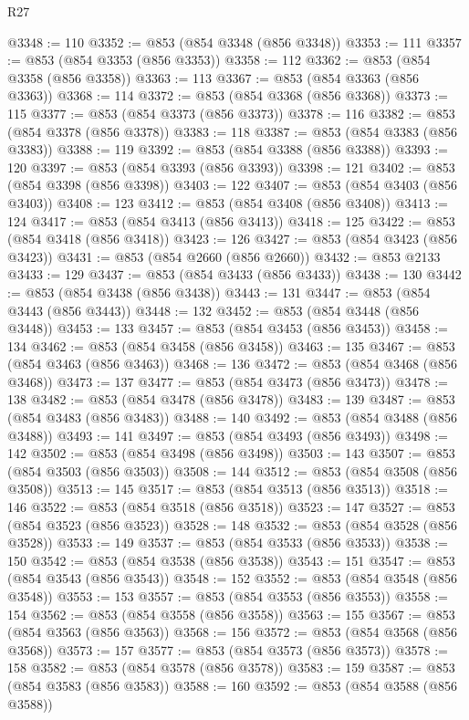\begin{lexlean}{R27}
\begin{coremodule}
@3348 := 110
@3352 := @853 (@854 @3348 (@856 @3348))
@3353 := 111
@3357 := @853 (@854 @3353 (@856 @3353))
@3358 := 112
@3362 := @853 (@854 @3358 (@856 @3358))
@3363 := 113
@3367 := @853 (@854 @3363 (@856 @3363))
@3368 := 114
@3372 := @853 (@854 @3368 (@856 @3368))
@3373 := 115
@3377 := @853 (@854 @3373 (@856 @3373))
@3378 := 116
@3382 := @853 (@854 @3378 (@856 @3378))
@3383 := 118
@3387 := @853 (@854 @3383 (@856 @3383))
@3388 := 119
@3392 := @853 (@854 @3388 (@856 @3388))
@3393 := 120
@3397 := @853 (@854 @3393 (@856 @3393))
@3398 := 121
@3402 := @853 (@854 @3398 (@856 @3398))
@3403 := 122
@3407 := @853 (@854 @3403 (@856 @3403))
@3408 := 123
@3412 := @853 (@854 @3408 (@856 @3408))
@3413 := 124
@3417 := @853 (@854 @3413 (@856 @3413))
@3418 := 125
@3422 := @853 (@854 @3418 (@856 @3418))
@3423 := 126
@3427 := @853 (@854 @3423 (@856 @3423))
@3431 := @853 (@854 @2660 (@856 @2660))
@3432 := @853 @2133
@3433 := 129
@3437 := @853 (@854 @3433 (@856 @3433))
@3438 := 130
@3442 := @853 (@854 @3438 (@856 @3438))
@3443 := 131
@3447 := @853 (@854 @3443 (@856 @3443))
@3448 := 132
@3452 := @853 (@854 @3448 (@856 @3448))
@3453 := 133
@3457 := @853 (@854 @3453 (@856 @3453))
@3458 := 134
@3462 := @853 (@854 @3458 (@856 @3458))
@3463 := 135
@3467 := @853 (@854 @3463 (@856 @3463))
@3468 := 136
@3472 := @853 (@854 @3468 (@856 @3468))
@3473 := 137
@3477 := @853 (@854 @3473 (@856 @3473))
@3478 := 138
@3482 := @853 (@854 @3478 (@856 @3478))
@3483 := 139
@3487 := @853 (@854 @3483 (@856 @3483))
@3488 := 140
@3492 := @853 (@854 @3488 (@856 @3488))
@3493 := 141
@3497 := @853 (@854 @3493 (@856 @3493))
@3498 := 142
@3502 := @853 (@854 @3498 (@856 @3498))
@3503 := 143
@3507 := @853 (@854 @3503 (@856 @3503))
@3508 := 144
@3512 := @853 (@854 @3508 (@856 @3508))
@3513 := 145
@3517 := @853 (@854 @3513 (@856 @3513))
@3518 := 146
@3522 := @853 (@854 @3518 (@856 @3518))
@3523 := 147
@3527 := @853 (@854 @3523 (@856 @3523))
@3528 := 148
@3532 := @853 (@854 @3528 (@856 @3528))
@3533 := 149
@3537 := @853 (@854 @3533 (@856 @3533))
@3538 := 150
@3542 := @853 (@854 @3538 (@856 @3538))
@3543 := 151
@3547 := @853 (@854 @3543 (@856 @3543))
@3548 := 152
@3552 := @853 (@854 @3548 (@856 @3548))
@3553 := 153
@3557 := @853 (@854 @3553 (@856 @3553))
@3558 := 154
@3562 := @853 (@854 @3558 (@856 @3558))
@3563 := 155
@3567 := @853 (@854 @3563 (@856 @3563))
@3568 := 156
@3572 := @853 (@854 @3568 (@856 @3568))
@3573 := 157
@3577 := @853 (@854 @3573 (@856 @3573))
@3578 := 158
@3582 := @853 (@854 @3578 (@856 @3578))
@3583 := 159
@3587 := @853 (@854 @3583 (@856 @3583))
@3588 := 160
@3592 := @853 (@854 @3588 (@856 @3588))

\end{coremodule}
\end{lexlean}
